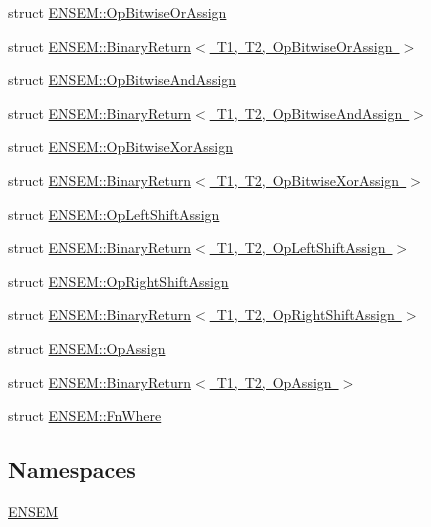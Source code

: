 \begin{DoxyCompactItemize}
\item 
struct \mbox{\hyperlink{structENSEM_1_1OpBitwiseOrAssign}{E\+N\+S\+E\+M\+::\+Op\+Bitwise\+Or\+Assign}}
\item 
struct \mbox{\hyperlink{structENSEM_1_1BinaryReturn_3_01T1_00_01T2_00_01OpBitwiseOrAssign_01_4}{E\+N\+S\+E\+M\+::\+Binary\+Return$<$ T1, T2, Op\+Bitwise\+Or\+Assign $>$}}
\item 
struct \mbox{\hyperlink{structENSEM_1_1OpBitwiseAndAssign}{E\+N\+S\+E\+M\+::\+Op\+Bitwise\+And\+Assign}}
\item 
struct \mbox{\hyperlink{structENSEM_1_1BinaryReturn_3_01T1_00_01T2_00_01OpBitwiseAndAssign_01_4}{E\+N\+S\+E\+M\+::\+Binary\+Return$<$ T1, T2, Op\+Bitwise\+And\+Assign $>$}}
\item 
struct \mbox{\hyperlink{structENSEM_1_1OpBitwiseXorAssign}{E\+N\+S\+E\+M\+::\+Op\+Bitwise\+Xor\+Assign}}
\item 
struct \mbox{\hyperlink{structENSEM_1_1BinaryReturn_3_01T1_00_01T2_00_01OpBitwiseXorAssign_01_4}{E\+N\+S\+E\+M\+::\+Binary\+Return$<$ T1, T2, Op\+Bitwise\+Xor\+Assign $>$}}
\item 
struct \mbox{\hyperlink{structENSEM_1_1OpLeftShiftAssign}{E\+N\+S\+E\+M\+::\+Op\+Left\+Shift\+Assign}}
\item 
struct \mbox{\hyperlink{structENSEM_1_1BinaryReturn_3_01T1_00_01T2_00_01OpLeftShiftAssign_01_4}{E\+N\+S\+E\+M\+::\+Binary\+Return$<$ T1, T2, Op\+Left\+Shift\+Assign $>$}}
\item 
struct \mbox{\hyperlink{structENSEM_1_1OpRightShiftAssign}{E\+N\+S\+E\+M\+::\+Op\+Right\+Shift\+Assign}}
\item 
struct \mbox{\hyperlink{structENSEM_1_1BinaryReturn_3_01T1_00_01T2_00_01OpRightShiftAssign_01_4}{E\+N\+S\+E\+M\+::\+Binary\+Return$<$ T1, T2, Op\+Right\+Shift\+Assign $>$}}
\item 
struct \mbox{\hyperlink{structENSEM_1_1OpAssign}{E\+N\+S\+E\+M\+::\+Op\+Assign}}
\item 
struct \mbox{\hyperlink{structENSEM_1_1BinaryReturn_3_01T1_00_01T2_00_01OpAssign_01_4}{E\+N\+S\+E\+M\+::\+Binary\+Return$<$ T1, T2, Op\+Assign $>$}}
\item 
struct \mbox{\hyperlink{structENSEM_1_1FnWhere}{E\+N\+S\+E\+M\+::\+Fn\+Where}}
\end{DoxyCompactItemize}
\subsection*{Namespaces}
\begin{DoxyCompactItemize}
\item 
 \mbox{\hyperlink{namespaceENSEM}{E\+N\+S\+EM}}
\end{DoxyCompactItemize}
